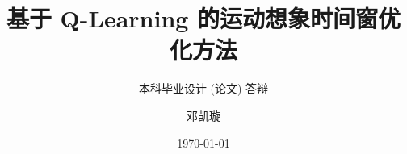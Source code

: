 
\author[邓凯璇]{邓凯璇}
\title{基于 Q-Learning 的运动想象时间窗优化方法}
\subtitle{本科毕业设计 (论文) 答辩}
\date{\today}

\def\cmd#1{\texttt{\color{red}\footnotesize $\backslash$#1}}

\def\env#1{\texttt{\color{blue}\footnotesize #1}}
